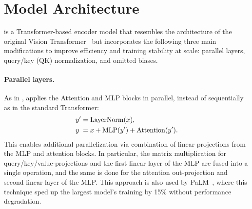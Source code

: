\section{Model Architecture}
\label{sec:model_architecture}

\chonk is a Transformer-based encoder model that resembles the architecture of the original Vision Transformer~\citep{dosovitskiy2020image} but incorporates the following three main modifications to improve efficiency and training stability at scale: parallel layers, query/key (QK) normalization, and omitted biases.


\paragraph{Parallel layers.}
As in \citet{gpt-j}, \chonk applies the Attention and MLP blocks in parallel, instead of sequentially as in the standard Transformer:
 \begin{align*} 
 y' &= \text{LayerNorm}(x),\\
 y\hphantom{'} &= x + \text{MLP}(y')+\text{Attention}(y').
 \end{align*}
This enables additional parallelization via combination of linear projections from the MLP and attention blocks. In particular, the matrix multiplication for query/key/value-projections and the first linear layer of the MLP are fused into a single operation, and the same is done for the attention out-projection and second linear layer of the MLP. This approach is also used by PaLM~\citep{chowdhery2022palm}, where this technique sped up the largest model's training by 15\% without performance degradation. 
    
